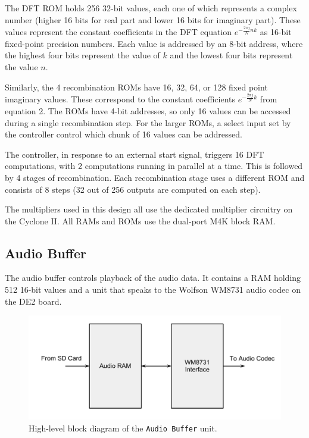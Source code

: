\documentclass{article}
\begin{document}
The DFT ROM holds 256 32-bit values, each one of which represents a
complex number (higher 16 bits for real part and lower 16 bits for
imaginary part). These values represent the constant coefficients
in the DFT equation \(e^{-\frac{2\pi j}{N} n k}\) as 16-bit fixed-point
precision numbers. Each value is addressed by an 8-bit address, where
the highest four bits represent the value of \(k\) and the lowest four bits
represent the value \(n\).

Similarly, the 4 recombination ROMs have 16, 32, 64, or 128 fixed point
imaginary values. These correspond to the constant coefficients
\(e^{-\frac{2\pi j}{N}k}\) from equation 2. The ROMs have 4-bit addresses, 
so only 16 values can be accessed during a single recombination step. 
For the larger ROMs, a select input set by the controller control which 
chunk of 16 values can be addressed.

The controller, in response to an external start signal, triggers
16 DFT computations, with 2 computations running in parallel at a time.
This is followed by 4 stages of recombination. Each recombination stage
uses a different ROM and consists of 8 steps (32 out of 256 outputs are
computed on each step).

The multipliers used in this design all use the dedicated multiplier 
circuitry on the Cyclone II. All RAMs and ROMs use the dual-port M4K
block RAM.
	
\subsection{Audio Buffer}

The audio buffer controls playback of the audio data. It contains a RAM
holding 512 16-bit values and a unit that speaks to the Wolfson WM8731
audio codec on the DE2 board.

\begin{figure}[H]
	\centering
	\includegraphics[scale=0.3]{audio-buffer}
	\caption{High-level block diagram of the \texttt{Audio Buffer} unit.}
\end{figure}
\end{document}
